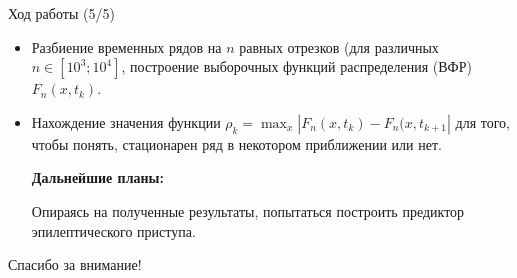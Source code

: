 \documentclass[aspectratio=169]{beamer}
\begin{document}
\begin{frame}{Ход работы (5/5)}
  \begin{itemize}
      \item {
        Разбиение временных рядов на $n$ равных отрезков (для различных $n \in [10^3; 10^4]$, построение выборочных функций распределения (ВФР) $F_n(x, t_k)$.
      }
      \item {
        Нахождение значения функции $\rho_k = \max_x{|F_n(x,t_k) - F_n(x,t_{k+1}|}$ для того, чтобы понять, стационарен ряд в некотором приближении или нет.
      }
  \par
  \textbf{Дальнейшие планы:}
  \par
  Опираясь на полученные результаты, попытаться построить предиктор эпилептического приступа.
  \end{itemize}
\end{frame}

\begin{frame}
\begin{center}
  \Huge{Спасибо за внимание!}
\end{center}
\end{frame}
\end{document}
